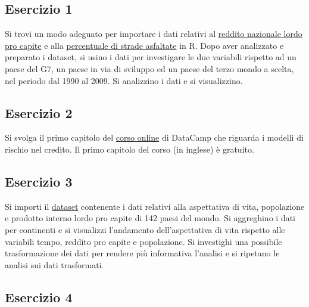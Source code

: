 \documentclass[]{book}
\begin{document}
\hypertarget{esercizio-1-2}{%
\subsection{Esercizio 1}\label{esercizio-1-2}}

Si trovi un modo adeguato per importare i dati relativi al \href{http://docs.google.com/spreadsheet/pub?key=0ArfEDsV3bBwCdGhJcHAwanc2aFdZeXl1WTVZQnJjb1E\&output=xlsx}{reddito nazionale lordo pro capite} e alla \href{http://docs.google.com/spreadsheet/pub?key=0AkBd6lyS3EmpdDBKd2V5VmxkYlJuUHAtOURzUkZzNEE\&output=csv}{percentuale di strade asfaltate} in R. Dopo aver analizzato e preparato i dataset, si usino i dati per investigare le due variabili rispetto ad un paese del G7, un paese in via di sviluppo ed un paese del terzo mondo a scelta, nel periodo dal 1990 al 2009.
Si analizzino i dati e si visualizzino.

\hypertarget{esercizio-2-2}{%
\subsection{Esercizio 2}\label{esercizio-2-2}}

Si svolga il primo capitolo del \href{https://www.datacamp.com/courses/introduction-to-credit-risk-modeling-in-r}{corso online} di DataCamp che riguarda i modelli di rischio nel credito. Il primo capitolo del corso (in inglese) è gratuito.

\hypertarget{esercizio-3-1}{%
\subsection{Esercizio 3}\label{esercizio-3-1}}

Si importi il \href{https://raw.githubusercontent.com/socviz/soc880/master/data/gapminder.csv}{dataset} contenente i dati relativi alla aspettativa di vita, popolazione e prodotto interno lordo pro capite di 142 paesi del mondo.
Si aggreghino i dati per continenti e si visualizzi l'andamento dell'aspettativa di vita rispetto alle variabili tempo, reddito pro capite e popolazione.
Si investighi una possibile trasformazione dei dati per rendere più informativa l'analisi e si ripetano le analisi sui dati trasformati.

\hypertarget{esercizio-4-1}{%
\subsection{Esercizio 4}\label{esercizio-4-1}}
\end{document}
